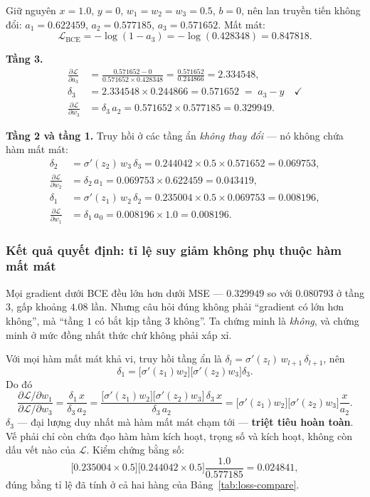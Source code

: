 Giữ nguyên $x=1.0$, $y=0$, $w_1=w_2=w_3=0.5$, $b=0$, nên lan truyền tiến không
đổi: $a_1 = 0.622459$, $a_2 = 0.577185$, $a_3 = 0.571652$. Mất mát:
\[
  \mathcal{L}_{\text{BCE}} = -\log(1-a_3) = -\log(0.428348) = 0.847818 .
\]

\noindent\textbf{Tầng 3.}
\begin{align*}
  \frac{\partial\mathcal{L}}{\partial a_3}
    &= \frac{0.571652 - 0}{0.571652\times 0.428348}
     = \frac{0.571652}{0.244866} = 2.334548,\\
  \delta_3 &= 2.334548\times 0.244866 = 0.571652 \;=\; a_3 - y \quad\checkmark\\
  \frac{\partial\mathcal{L}}{\partial w_3} &= \delta_3\,a_2
     = 0.571652\times 0.577185 = 0.329949 .
\end{align*}

\noindent\textbf{Tầng 2 và tầng 1.} Truy hồi ở các tầng ẩn \emph{không thay đổi}
--- nó không chứa hàm mất mát:
\begin{align*}
  \delta_2 &= \sigma'(z_2)\,w_3\,\delta_3
     = 0.244042\times 0.5\times 0.571652 = 0.069753,\\
  \frac{\partial\mathcal{L}}{\partial w_2} &= \delta_2\,a_1
     = 0.069753\times 0.622459 = 0.043419,\\[3pt]
  \delta_1 &= \sigma'(z_1)\,w_2\,\delta_2
     = 0.235004\times 0.5\times 0.069753 = 0.008196,\\
  \frac{\partial\mathcal{L}}{\partial w_1} &= \delta_1\,a_0
     = 0.008196\times 1.0 = 0.008196 .
\end{align*}

\subsubsection{Kết quả quyết định: tỉ lệ suy giảm không phụ thuộc hàm mất mát}

Mọi gradient dưới BCE đều lớn hơn dưới MSE --- $0.329949$ so với $0.080793$ ở
tầng $3$, gấp khoảng $4.08$ lần. Nhưng câu hỏi đúng không phải ``gradient có lớn
hơn không'', mà ``tầng $1$ có bắt kịp tầng $3$ không''. Ta chứng minh là
\emph{không}, và chứng minh ở mức đồng nhất thức chứ không phải xấp xỉ.

Với mọi hàm mất mát khả vi, truy hồi tầng ẩn là
$\delta_l = \sigma'(z_l)\,w_{l+1}\,\delta_{l+1}$, nên
\[
  \delta_1 = \bigl[\sigma'(z_1)w_2\bigr]\bigl[\sigma'(z_2)w_3\bigr]\delta_3 .
\]
Do đó
\begin{equation}
  \frac{\partial\mathcal{L}/\partial w_1}{\partial\mathcal{L}/\partial w_3}
  = \frac{\delta_1\,x}{\delta_3\,a_2}
  = \frac{\bigl[\sigma'(z_1)w_2\bigr]\bigl[\sigma'(z_2)w_3\bigr]\,\delta_3\,x}
         {\delta_3\,a_2}
  = \bigl[\sigma'(z_1)w_2\bigr]\bigl[\sigma'(z_2)w_3\bigr]\frac{x}{a_2}.
  \label{eq:lossfree}
\end{equation}
$\delta_3$ --- đại lượng duy nhất mà hàm mất mát chạm tới --- \textbf{triệt tiêu
hoàn toàn}. Vế phải chỉ còn chứa đạo hàm hàm kích hoạt, trọng số và kích hoạt,
không còn dấu vết nào của $\mathcal{L}$. Kiểm chứng bằng số:
\[
  \bigl[0.235004\times0.5\bigr]\bigl[0.244042\times0.5\bigr]\frac{1.0}{0.577185}
  = 0.024841 ,
\]
đúng bằng tỉ lệ đã tính ở cả hai hàng của Bảng~\ref{tab:loss-compare}.

